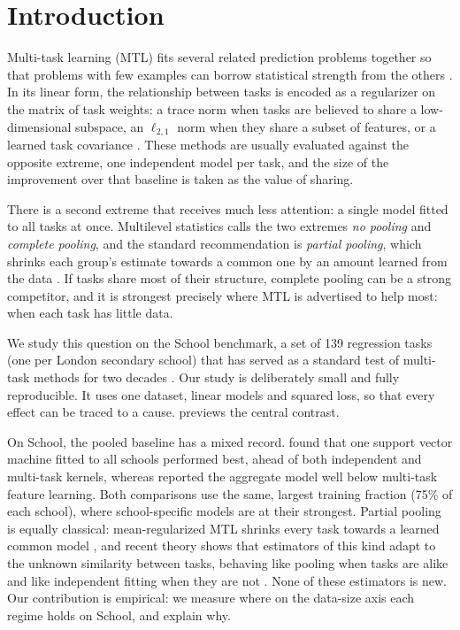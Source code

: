 \section{Introduction}
\label{sec:intro}

Multi-task learning (MTL) fits several related prediction problems together so that problems with few examples can borrow statistical strength from the others \citep{caruana1997multitask, zhang2022survey}. In its linear form, the relationship between tasks is encoded as a regularizer on the matrix of task weights: a trace norm when tasks are believed to share a low-dimensional subspace, an $\ell_{2,1}$ norm when they share a subset of features, or a learned task covariance \citep{argyriou2008convex, obozinski2010joint, zhang2010convex}. These methods are usually evaluated against the opposite extreme, one independent model per task, and the size of the improvement over that baseline is taken as the value of sharing.

There is a second extreme that receives much less attention: a single model fitted to all tasks at once. Multilevel statistics calls the two extremes \emph{no pooling} and \emph{complete pooling}, and the standard recommendation is \emph{partial pooling}, which shrinks each group's estimate towards a common one by an amount learned from the data \citep{gelman2007data}. If tasks share most of their structure, complete pooling can be a strong competitor, and it is strongest precisely where MTL is advertised to help most: when each task has little data.

We study this question on the School benchmark, a set of 139 regression tasks (one per London secondary school) that has served as a standard test of multi-task methods for two decades \citep{bakker2003task, evgeniou2005kernel, argyriou2008convex}. Our study is deliberately small and fully reproducible. It uses one dataset, linear models and squared loss, so that every effect can be traced to a cause.  previews the central contrast.

On School, the pooled baseline has a mixed record. \citet{evgeniou2005kernel} found that one support vector machine fitted to all schools performed best, ahead of both independent and multi-task kernels, whereas \citet{argyriou2008convex} reported the aggregate model well below multi-task feature learning. Both comparisons use the same, largest training fraction (75\% of each school), where school-specific models are at their strongest. Partial pooling is equally classical: mean-regularized MTL shrinks every task towards a learned common model \citep{evgeniou2004regularized}, and recent theory shows that estimators of this kind adapt to the unknown similarity between tasks, behaving like pooling when tasks are alike and like independent fitting when they are not \citep{duan2023adaptive}. None of these estimators is new. Our contribution is empirical: we measure where on the data-size axis each regime holds on School, and explain why.

